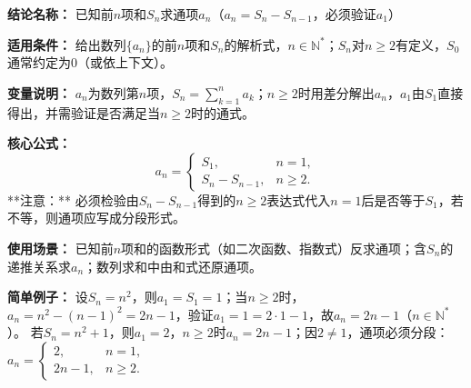 \textbf{结论名称：} 已知前$n$项和$S_n$求通项$a_n$（$a_n=S_n-S_{n-1}$，必须验证$a_1$）  

\textbf{适用条件：} 给出数列$\{a_n\}$的前$n$项和$S_n$的解析式，$n\in\mathbb{N}^*$；$S_n$对$n\ge 2$有定义，$S_0$通常约定为$0$（或依上下文）。  

\textbf{变量说明：} $a_n$为数列第$n$项，$S_n=\sum_{k=1}^{n} a_k$；$n\ge 2$时用差分解出$a_n$，$a_1$由$S_1$直接得出，并需验证是否满足当$n\ge 2$时的通式。  

\textbf{核心公式：}  
\[
\boxed{
a_n = 
\begin{cases}
S_1, & n=1,\\[4pt]
S_n - S_{n-1}, & n\ge 2.
\end{cases}
}
\]
**注意：** 必须检验由$S_n-S_{n-1}$得到的$n\ge 2$表达式代入$n=1$后是否等于$S_1$，若不等，则通项应写成分段形式。  

\textbf{使用场景：} 已知前$n$项和的函数形式（如二次函数、指数式）反求通项；含$S_n$的递推关系求$a_n$；数列求和中由和式还原通项。  

\textbf{简单例子：} 设$S_n=n^2$，则$a_1=S_1=1$；当$n\ge 2$时，$a_n=n^2-(n-1)^2=2n-1$，验证$a_1=1=2\cdot1-1$，故$a_n=2n-1$（$n\in\mathbb{N}^*$）。  
若$S_n=n^2+1$，则$a_1=2$，$n\ge 2$时$a_n=2n-1$；因$2\neq1$，通项必须分段：$a_n=\begin{cases}2,&n=1,\\ 2n-1,&n\ge2.\end{cases}$